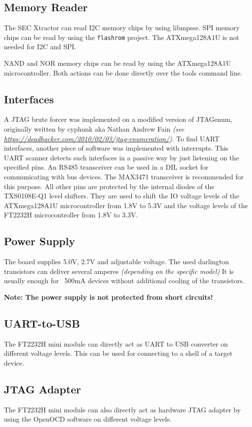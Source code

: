 \documentclass[a4paper]{report}
\begin{document}
\subsection{Memory Reader}
The SEC Xtractor can read I2C memory chips by using libmpsse.
SPI memory chips can be read by using the \texttt{flashrom} project.
The ATXmega128A1U is not needed for I2C and SPI.

NAND and NOR memory chips can be read by using the ATXmega128A1U microcontroller.
Both actions can be done directly over the tools command line.

\subsection{Interfaces}
A JTAG brute forcer was implemented on a modified version of JTAGenum, originally written by cyphunk aka Nathan Andrew Fain \textit{(see \url{https://deadhacker.com/2010/02/03/jtag-enumeration/})}.
To find UART interfaces, another piece of software was implemented with interrupts.
This UART scanner detects such interfaces in a passive way by just listening on the specified pins.
An RS485 transceiver can be used in a DIL socket for communicating with bus devices.
The MAX3471 transceiver is recommended for this purpose.
All other pins are protected by the internal diodes of the TXS0108E-Q1 level shifters.
They are used to shift the IO voltage levels of the ATXmega128A1U microcontroller from 1.8V to 5.3V and the voltage levels of the FT2232H microcontroller from 1.8V to 3.3V.

\subsection{Power Supply}
The board supplies 5.0V, 2.7V and adjustable voltage.
The used darlington transistors can deliver several amperes \textit{(depending on the specific model)}
It is usually enough for ~500mA devices without additional cooling of the transistors.

\textbf{Note: The power supply is not protected from short circuits!}
\subsection{UART-to-USB}
The FT2232H mini module can directly act as UART to USB converter on different voltage levels.
This can be used for connecting to a shell of a target device.

\subsection{JTAG Adapter}
The FT2232H mini module can also directly act as hardware JTAG adapter by using the OpenOCD software on different voltage levels.
\end{document}
